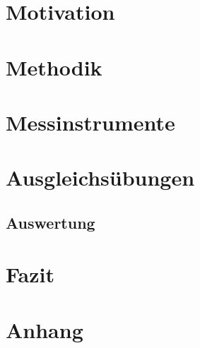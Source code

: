 
   \section{Motivation}
   

   \section{Methodik}
   

   \section{Messinstrumente}
   

   \section{Ausgleichsübungen}
   

   \subsection{Auswertung}
   

   \section{Fazit}
   

   \newpage
   \section{Anhang}
   
   \newpage

   \nocite{*}
   \printbibliography
   
